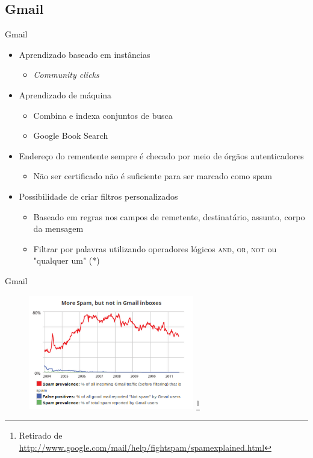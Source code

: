 \documentclass[dvipdfm]{beamer}
\begin{document}
\subsection{Gmail}
\begin{frame}{Gmail}
	\begin{itemize}
		\item Aprendizado baseado em instâncias
		\begin{itemize}
			\item \emph{Community clicks}
		\end{itemize}
		\item Aprendizado de máquina
		\begin{itemize}
			\item Combina e indexa conjuntos de busca
			\item Google Book Search
		\end{itemize}
		\item Endereço do rementente sempre é checado por meio de órgãos autenticadores
		\begin{itemize}
			\item Não ser certificado não é suficiente para ser marcado como spam
		\end{itemize}
		\item Possibilidade de criar filtros personalizados
		\begin{itemize}
			\item Baseado em regras nos campos de remetente, destinatário, assunto, corpo da mensagem
			\item Filtrar por palavras utilizando operadores lógicos \textsc{and}, \textsc{or}, \textsc{not} ou "qualquer um" (\textsc{*})
		\end{itemize}
	\end{itemize}
\end{frame}

\begin{frame}{Gmail}
	\begin{figure}
		\includegraphics[height=5cm]{Imagens/gmail/spamchart.png} \footnote{Retirado de \url{http://www.google.com/mail/help/fightspam/spamexplained.html}}
	\end{figure}
\end{frame}
\end{document}
